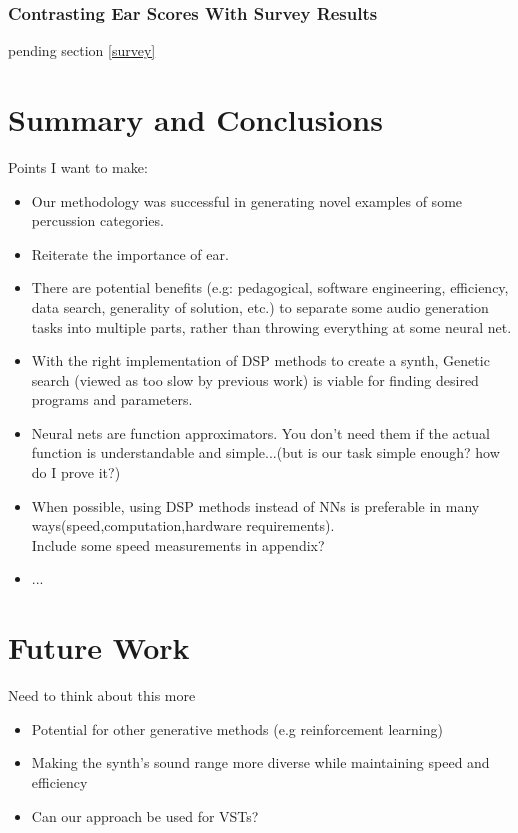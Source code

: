 \documentclass{nime-alternate} %
\begin{document}
\subsubsection{Contrasting Ear Scores With Survey Results}
\colorbox{green!=30}{pending section \ref{survey}}

\section{Summary and Conclusions}
\colorbox{green!=30}{Points I want to make:}
\begin{itemize}
    \item Our methodology was successful in generating novel examples of some percussion categories.
    \item Reiterate the importance of ear.
    \item There are potential benefits (e.g: pedagogical, software engineering, efficiency, data search, generality of solution, etc.) to separate some audio generation tasks into multiple parts, rather than throwing everything at some neural net. 
    \item With the right implementation of DSP methods to create a synth, Genetic search (viewed as too slow by previous work) is viable for finding  desired programs and parameters.
    \item Neural nets are function approximators. You don't need them if the actual function is understandable and simple...(but is our task simple enough? how do I prove it?)
    \item When possible, using DSP methods instead of NNs is preferable in many ways(speed,computation,hardware requirements).\\
    \colorbox{green!=30}{Include some speed measurements in appendix?}
    \item ...
\end{itemize}
\section{Future Work}
\colorbox{blue!=30}{Need to think about this more}
\begin{itemize}
    \item Potential for other generative methods (e.g reinforcement learning)
    \item Making the synth's sound range more diverse while maintaining speed and efficiency
    \item Can our approach be used for VSTs?
\end{itemize}
\end{document}
